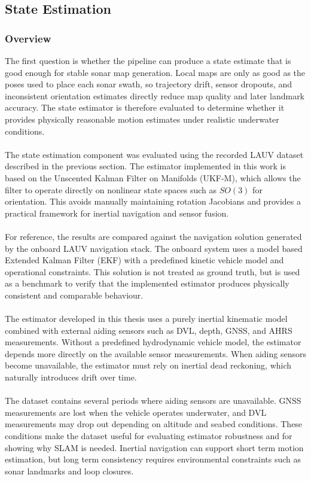 \subsection{State Estimation}
\subsubsection{Overview}
The first question is whether the pipeline can produce a state estimate that is good enough for stable sonar map generation. Local maps are only as good as the poses used to place each sonar swath, so trajectory drift, sensor dropouts, and inconsistent orientation estimates directly reduce map quality and later landmark accuracy. The state estimator is therefore evaluated to determine whether it provides physically reasonable motion estimates under realistic underwater conditions.
\\ \\
The state estimation component was evaluated using the recorded LAUV dataset described in the previous section. The estimator implemented in this work is based on the Unscented Kalman Filter on Manifolds (UKF-M), which allows the filter to operate directly on nonlinear state spaces such as $SO(3)$ for orientation. This avoids manually maintaining rotation Jacobians and provides a practical framework for inertial navigation and sensor fusion.
\\ \\
For reference, the results are compared against the navigation solution generated by the onboard LAUV navigation stack. The onboard system uses a model based Extended Kalman Filter (EKF) with a predefined kinetic vehicle model and operational constraints. This solution is not treated as ground truth, but is used as a benchmark to verify that the implemented estimator produces physically consistent and comparable behaviour.
\\ \\
The estimator developed in this thesis uses a purely inertial kinematic model combined with external aiding sensors such as DVL, depth, GNSS, and AHRS measurements. Without a predefined hydrodynamic vehicle model, the estimator depends more directly on the available sensor measurements. When aiding sensors become unavailable, the estimator must rely on inertial dead reckoning, which naturally introduces drift over time.
\\ \\
The dataset contains several periods where aiding sensors are unavailable. GNSS measurements are lost when the vehicle operates underwater, and DVL measurements may drop out depending on altitude and seabed conditions. These conditions make the dataset useful for evaluating estimator robustness and for showing why SLAM is needed. Inertial navigation can support short term motion estimation, but long term consistency requires environmental constraints such as sonar landmarks and loop closures.



